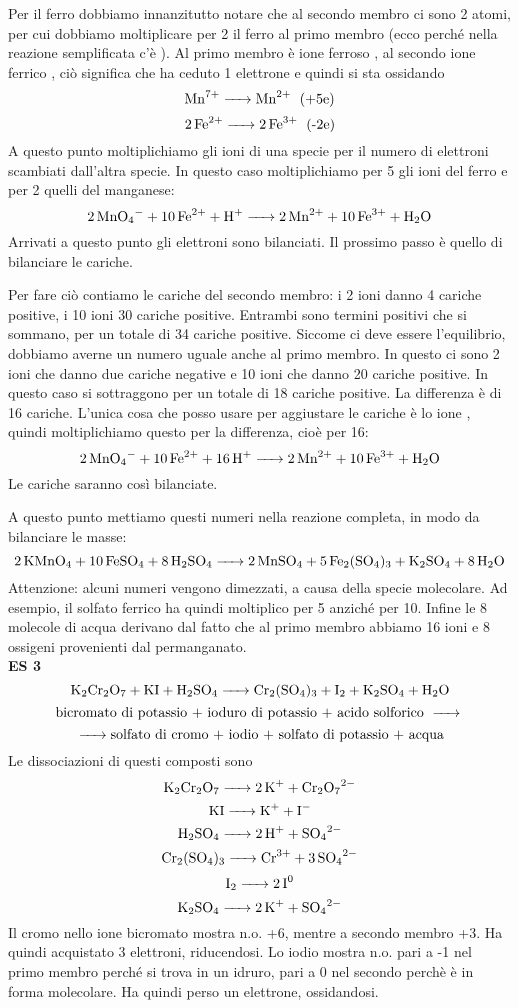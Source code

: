 Per il ferro dobbiamo innanzitutto notare che al secondo membro ci sono 2 atomi, per cui dobbiamo moltiplicare per 2 il ferro al primo membro (ecco perché nella reazione semplificata c'è ). Al primo membro è ione ferroso , al secondo ione ferrico , ciò significa che ha ceduto 1 elettrone e quindi si sta ossidando
$$\ce{Mn^7+ -> Mn^2+ \; \text{(+5e)}}$$
$$\ce{2Fe^2+ -> 2Fe^3+ \; \text{(-2e)}}$$
A questo punto moltiplichiamo gli ioni di una specie per il numero di elettroni scambiati dall'altra specie. In questo caso moltiplichiamo per 5 gli ioni del ferro e per 2 quelli del manganese:
$$\ce{2MnO_4- + 10Fe^2+ + H+ -> 2Mn^2+ + 10Fe^3+ + H_2O}$$
Arrivati a questo punto gli elettroni sono bilanciati. Il prossimo passo è quello di bilanciare le cariche.

Per fare ciò contiamo le cariche del secondo membro: i 2 ioni  danno 4 cariche positive, i 10 ioni  30 cariche positive. Entrambi sono termini positivi che si sommano, per un totale di 34 cariche positive. Siccome ci deve essere l'equilibrio, dobbiamo averne un numero uguale anche al primo membro. In questo ci sono 2 ioni  che danno due cariche negative e 10 ioni  che danno 20 cariche positive. In questo caso si sottraggono per un totale di 18 cariche positive. La differenza è di 16 cariche. L'unica cosa che posso usare per aggiustare le cariche è lo ione , quindi moltiplichiamo questo per la differenza, cioè per 16:
$$\ce{2MnO_4- + 10Fe^2+ + 16H+ -> 2Mn^2+ + 10Fe^3+ + H_2O}$$
Le cariche saranno così bilanciate.

A questo punto mettiamo questi numeri nella reazione completa, in modo da bilanciare le masse:
$$\ce{2KMnO_4 + 10FeSO_4 + 8H_2SO_4 -> 2MnSO_4 + 5Fe_2(SO_4)_3 + K_2SO_4 + 8H_2O}$$
Attenzione: alcuni numeri vengono dimezzati, a causa della specie molecolare. Ad esempio, il solfato ferrico ha  quindi moltiplico per 5 anziché per 10. Infine le 8 molecole di acqua derivano dal fatto che al primo membro abbiamo 16 ioni  e 8 ossigeni provenienti dal permanganato.\\
\textbf{ES 3}
$$\ce{K_2Cr_2O_7 + KI + H_2SO_4 -> Cr_2(SO_4)_3 + I_2 + K_2SO_4 + H_2O}$$
$$\text{bicromato di potassio + ioduro di potassio + acido solforico \ce{->}}$$
$${\ce{->} \text{solfato di cromo +  iodio + solfato di potassio + acqua}}$$
Le dissociazioni di questi composti sono
$$\ce{K_2Cr_2O_7 -> 2K^+ + Cr_2O_7^2-}$$ 
$$\ce{KI -> K+ + I-}$$
$$\ce{H_2SO_4 -> 2H+ + SO_4^2-}$$
$$\ce{Cr_2(SO_4)_3 -> Cr^3+ + 3SO_4^2-}$$
$$\ce{I_2 -> 2I^0}$$
$$\ce{K_2SO_4 -> 2K+ + SO_4^2-}$$
Il cromo nello ione bicromato mostra n.o. +6, mentre a secondo membro +3. Ha quindi acquistato 3 elettroni, riducendosi.
Lo iodio mostra n.o. pari a -1 nel primo membro perché si trova in un idruro, pari a 0 nel secondo perchè è in forma molecolare. Ha quindi perso un elettrone, ossidandosi. 

